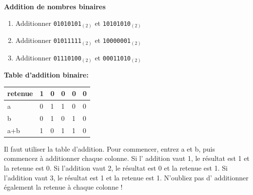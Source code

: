 \begin{Exercice}[15 minutes] \textbf{Addition de nombres binaires}
    \begin{enumerate}
        \item Additionner \lstinline{01010101}$_{(2)}$ et \lstinline{10101010}$_{(2)}$
        \item Additionner \lstinline{01011111}$_{(2)}$ et \lstinline{10000001}$_{(2)}$
        \item Additionner \lstinline{01110100}$_{(2)}$ et \lstinline{00011010}$_{(2)}$
    \end{enumerate}
    \begin{conseil}
\textbf{Table d'addition binaire:}\\
\begin{tabular}{| C{0.1\textwidth} | C{0.1\textwidth} | C{0.1\textwidth} | C{0.1\textwidth} | C{0.1\textwidth} | C{0.1\textwidth} |} 
    \hline
    retenue & 1 & 0 & 0 & 0 & 0 \\ [0.5ex] 
    \hline
    a & 0 & 1 & 1 & 0 & 0 \\ [0.5ex] 
    \hline
    b & 0 & 1 & 0 & 1 & 0 \\ [0.5ex] 
    \hline
    a+b & 1 & 0 & 1 & 1 & 0 \\ [0.5ex] 
    \hline
\end{tabular}
    \end{conseil}
    \begin{solution}
        Il faut utiliser la table d'addition. Pour commencer, entrez a et b, puis commencez à additionner chaque colonne. Si l' addition vaut 1, le résultat est 1 et la retenue est 0. Si l'addition vaut 2, le résultat est 0 et la retenue est 1. Si l'addition vaut 3, le résultat est 1 et la retenue est 1. N'oubliez pas d' additionner également la retenue à chaque colonne ! \\


\end{solution}
\end{Exercice}
